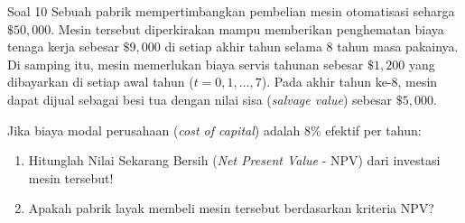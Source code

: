 \documentclass[11pt,a4paper]{article}
\begin{document}
\vspace{1.5em}

\begin{problembox}{Soal 10}
Sebuah pabrik mempertimbangkan pembelian mesin otomatisasi seharga $\$50{,}000$. Mesin tersebut diperkirakan mampu memberikan penghematan biaya tenaga kerja sebesar $\$9{,}000$ di setiap akhir tahun selama 8 tahun masa pakainya. Di samping itu, mesin memerlukan biaya servis tahunan sebesar $\$1{,}200$ yang dibayarkan di setiap awal tahun ($t = 0, 1, \dots, 7$). Pada akhir tahun ke-8, mesin dapat dijual sebagai besi tua dengan nilai sisa (\textit{salvage value}) sebesar $\$5{,}000$.

Jika biaya modal perusahaan (\textit{cost of capital}) adalah $8\%$ efektif per tahun:
\begin{enumerate}[label=(\alph*)]
    \item Hitunglah Nilai Sekarang Bersih (\textit{Net Present Value} - NPV) dari investasi mesin tersebut!
    \item Apakah pabrik layak membeli mesin tersebut berdasarkan kriteria NPV?
\end{enumerate}
\end{problembox}
\end{document}

